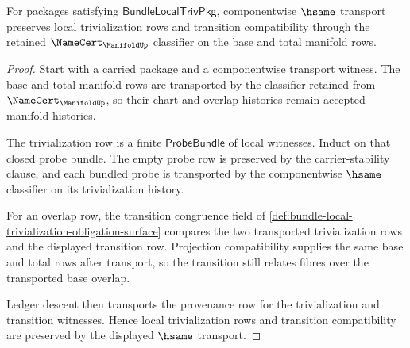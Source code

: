 \begin{theorem}
\label{thm:bundle-trivialization-transition-stability}
For packages satisfying $\mathsf{BundleLocalTrivPkg}$, componentwise $\hsame$
transport preserves local trivialization rows and transition compatibility
through the retained $\NameCert_{\ManifoldUp}$ classifier on the base and total
manifold rows.
\end{theorem}
\begin{proof}
Start with a carried package and a componentwise transport witness. The base
and total manifold rows are transported by the classifier retained from
$\NameCert_{\ManifoldUp}$, so their chart and overlap histories remain accepted
manifold histories.

The trivialization row is a finite $\mathsf{ProbeBundle}$ of local witnesses.
Induct on that closed probe bundle. The empty probe row is preserved by the
carrier-stability clause, and each bundled probe is transported by the
componentwise $\hsame$ classifier on its trivialization history.

For an overlap row, the transition congruence field of
\autoref{def:bundle-local-trivialization-obligation-surface} compares the two
transported trivialization rows and the displayed transition row. Projection
compatibility supplies the same base and total rows after transport, so the
transition still relates fibres over the transported base overlap.

Ledger descent then transports the provenance row for the trivialization and
transition witnesses. Hence local trivialization rows and transition
compatibility are preserved by the displayed $\hsame$ transport.
\end{proof}


